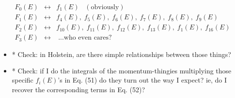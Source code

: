 \begin{eqnarray}
F_0(E) &\leftrightarrow& f_1(E) \;\;\; \mathrm{    (obviously)} \\
F_1(E) &\leftrightarrow& f_4(E), \; f_5(E), \; f_6(E), \; f_7(E), \; f_8(E), \; f_9(E) \\
F_2(E) &\leftrightarrow& f_{10}(E), \; f_{11}(E), \; f_{12}(E), \; f_{13}(E), \; f_1(E), \; f_{16}(E) \\ 
F_3(E) &\leftrightarrow& \; \textrm{...who even cares?}
\end{eqnarray}


\begin{itemize}
	\item * Check: in Holstein, are there simple relationships between those things?  
	\item * Check: if I do the integrals of the momentum-thingies multiplying those specific $f_i(E)$'s in Eq. (51) do they turn out the way I expect?  ie, do I recover the corresponding terms in Eq. (52)? 
\end{itemize}

